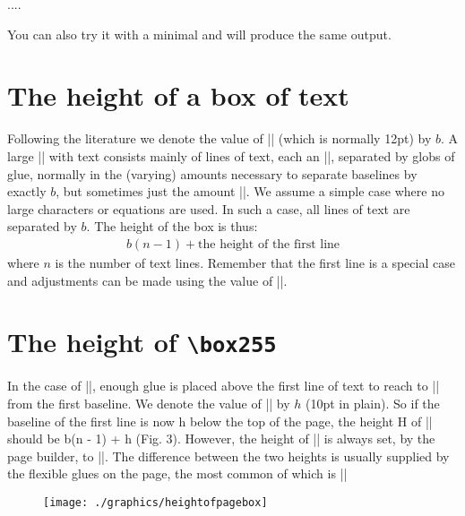\begin{teXXX}
....
\showthe\pagedepth
\bye
\end{teXXX}

You can also try it with a \latex minimal and will produce the same output.


\section{The height of a box of text}

Following the literature we denote the value of |\baselineskip| (which is normally 12pt) by $b$. 
A
large |\vbox| with text consists mainly of lines of
text, each an |\hbox|, separated by globs of glue,
normally in the (varying) amounts necessary to
separate baselines by exactly $b$, but sometimes just
the amount |\lineskip|. We assume a simple case
where no large characters or equations are used. In
such a case, all lines of text are separated by $b$. The
height of the box is thus:
\begin{gather}
b(n - 1) + \text{the height of the first line}
\end{gather}
where $n$ is the number of text lines. Remember that the first line is a special case and adjustments can be made using the value of |\topskip|.

\section{The height of \texttt{\textbackslash box255}}

In the case of ||,
enough glue is placed above the first line of text
to reach to |\topskip| from the first baseline. We
denote the value of |\topskip| by $h$ (10pt in plain).
So if the baseline of the first line is now h below the
top of the page, the height H of || should
be b(n - 1) + h (Fig. 3). However, the height of
|| is always set, by the page builder, to
|\vsize|. The difference between the two heights is
usually supplied by the flexible glues on the page,
the most common of which is |\parskip|

\begin{figure}[htp]
\texttt{[image: ./graphics/heightofpagebox]}
\end{figure}

